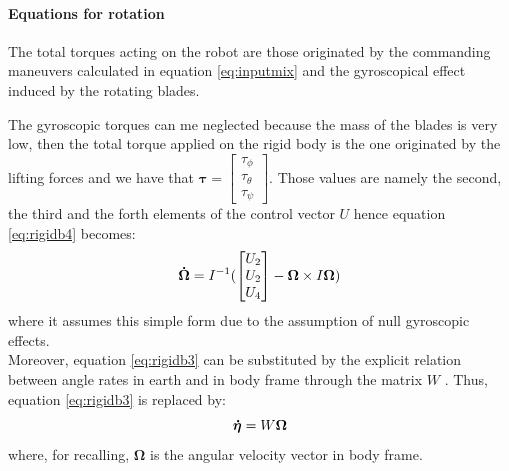 \noindent
\paragraph{Equations for rotation}
The total torques acting on the robot are those originated by the commanding maneuvers calculated in equation \ref{eq:inputmix} and the gyroscopical effect induced by the rotating blades. \par The gyroscopic torques can me neglected because the mass of the blades is very low, then the total torque applied on the rigid body is the one originated by the lifting forces and we have that $\boldsymbol{\tau} = \begin{bmatrix}
\tau_\phi\\\tau_\theta\\\tau_\psi
\end{bmatrix}$. Those values are namely the second, the third and the forth elements of the control vector $U$ hence equation \ref{eq:rigidb4} becomes:
\vspace{1ex}
\begin{equation}
\vspace{1ex}
\boldsymbol{\dot{\Omega}} =I^{-1}(\begin{bmatrix}
U_2\\U_2\\U_4
\end{bmatrix} -\boldsymbol{\Omega} \times I\boldsymbol{\Omega})
\label{eq:rigidb4new}
\end{equation}
where it assumes this simple form due to the assumption of null gyroscopic effects.\\

\noindent
Moreover, equation \ref{eq:rigidb3} can be substituted by the explicit relation between angle rates in earth and in body frame through the matrix $W$ \cite{Kendoul2007}. Thus, equation \ref{eq:rigidb3} is replaced by:
\vspace{1ex}
\begin{equation}
\vspace{1ex}
\boldsymbol{\dot{\eta}} = W\boldsymbol{\Omega}
\label{eq:rigidb3new}
\end{equation}
where, for recalling, $\boldsymbol{\Omega}$ is the angular velocity vector in body frame.

